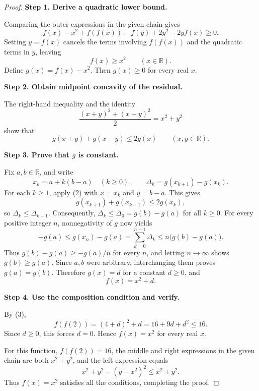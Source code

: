 
\begin{dlsummary}[title={\bfseries Solution 31. The Iterated Parallelogram--Quadratic Squeeze},breakable]

\begin{proof}
\textbf{Step 1. Derive a quadratic lower bound.}

Comparing the outer expressions in the given chain gives
\[
f(x)-x^2+f(f(x))-f(y)+2y^2-2yf(x)\geq0.
\]
Setting $y=f(x)$ cancels the terms involving $f(f(x))$ and the quadratic
terms in $y$, leaving
\[
f(x)\geq x^2\qquad(x\in\mathbb R). \tag{1}
\]
Define $g(x)=f(x)-x^2$. Then $g(x)\geq0$ for every real $x$.

\medskip
\noindent
\textbf{Step 2. Obtain midpoint concavity of the residual.}

The right-hand inequality and the identity
\[
\frac{(x+y)^2+(x-y)^2}{2}=x^2+y^2
\]
show that
\[
g(x+y)+g(x-y)\leq2g(x)\qquad(x,y\in\mathbb R). \tag{2}
\]

\medskip
\noindent
\textbf{Step 3. Prove that $g$ is constant.}

Fix $a,b\in\mathbb R$, and write
\[
x_k=a+k(b-a)\quad(k\geq0),
\qquad
\Delta_k=g(x_{k+1})-g(x_k).
\]
For each $k\geq1$, apply (2) with $x=x_k$ and $y=b-a$. This gives
\[
g(x_{k+1})+g(x_{k-1})\leq2g(x_k),
\]
so $\Delta_k\leq\Delta_{k-1}$. Consequently,
$\Delta_k\leq\Delta_0=g(b)-g(a)$ for all $k\geq0$. For every positive
integer $n$, nonnegativity of $g$ now yields
\[
-g(a)\leq g(x_n)-g(a)
=\sum_{k=0}^{n-1}\Delta_k
\leq n\bigl(g(b)-g(a)\bigr).
\]
Thus $g(b)-g(a)\geq-g(a)/n$ for every $n$, and letting $n\to\infty$
shows $g(b)\geq g(a)$. Since $a,b$ were arbitrary, interchanging them
proves $g(a)=g(b)$. Therefore $g(x)=d$ for a constant $d\geq0$, and
\[
f(x)=x^2+d. \tag{3}
\]

\medskip
\noindent
\textbf{Step 4. Use the composition condition and verify.}

By (3),
\[
f(f(2))=(4+d)^2+d=16+9d+d^2\leq16.
\]
Since $d\geq0$, this forces $d=0$. Hence $f(x)=x^2$ for every real $x$.

For this function, $f(f(2))=16$, the middle and right expressions in
the given chain are both $x^2+y^2$, and the left expression equals
\[
x^2+y^2-(y-x^2)^2\leq x^2+y^2.
\]
Thus $f(x)=x^2$ satisfies all the conditions, completing the proof.
\end{proof}

\end{dlsummary}
